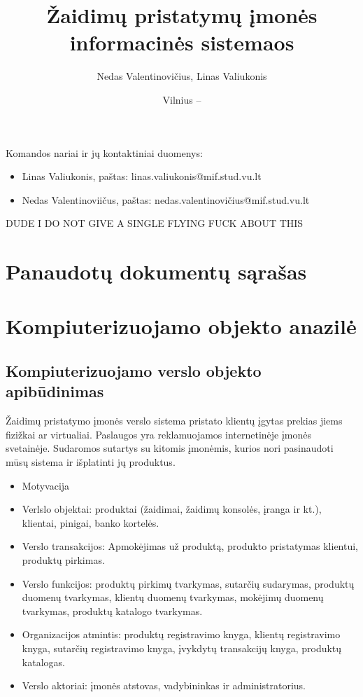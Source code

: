 \documentclass{VUMIFPSkursinis}
\title{Žaidimų pristatymų įmonės informacinės sistemaos}
\author{Nedas Valentinovičius, Linas Valiukonis}
\date{Vilnius – \the\year}
\begin{document}
	
\maketitle
\cleardoublepage{}
\setcounter{page}{2}

Komandos nariai ir jų kontaktiniai duomenys:
\begin{itemize}
	\item Linas Valiukonis, paštas: linas.valiukonis@mif.stud.vu.lt
	\item Nedas Valentinoviičus, paštas: nedas.valentinovičius@mif.stud.vu.lt
\end{itemize}

\tableofcontents

DUDE I DO NOT GIVE A SINGLE FLYING FUCK ABOUT THIS

\section{Panaudotų dokumentų sąrašas}



\newpage
\section{Kompiuterizuojamo objekto anazilė}

\newpage
\subsection{Kompiuterizuojamo verslo objekto apibūdinimas}
Žaidimų pristatymo įmonės verslo sistema pristato klientų įgytas prekias jiems fizižkai ar virtualiai. Paslaugos yra reklamuojamos internetinėje įmonės svetainėje. Sudaromos sutartys su kitomis įmonėmis, kurios nori pasinaudoti mūsų sistema ir išplatinti jų produktus.
\begin{itemize}
	\item Motyvacija
	\item Verlslo objektai: produktai (žaidimai, žaidimų konsolės, įranga ir kt.), klientai, pinigai, banko kortelės.
	\item Verslo transakcijos: Apmokėjimas už produktą, produkto pristatymas klientui, produktų pirkimas.
	\item Verslo funkcijos: produktų pirkimų tvarkymas, sutarčių sudarymas, produktų duomenų tvarkymas, klientų duomenų tvarkymas, mokėjimų duomenų tvarkymas, produktų katalogo tvarkymas.
	\item Organizacijos atmintis: produktų registravimo knyga, klientų registravimo knyga, sutarčių registravimo knyga, įvykdytų transakcijų knyga, produktų katalogas.
	\item Verslo aktoriai: įmonės atstovas, vadybininkas ir administratorius.
\end{itemize}
\newpage
\end{document}
